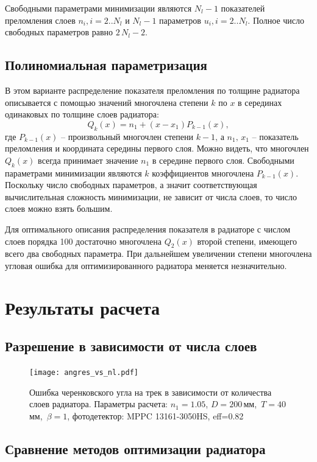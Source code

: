 \documentclass[12pt]{article}
\begin{document}
Свободными параметрами минимизации являются $N_l-1$ показателей преломления слоев $n_i, i=2..N_l$ и $N_l-1$ параметров $u_i, i=2..N_l$. 
Полное число свободных параметров равно $2\,N_l - 2$.

\subsection{Полиномиальная параметризация}
В этом варианте распределение показателя преломления по толщине радиатора описывается с помощью значений многочлена степени $k$ по $x$ в серединах одинаковых по толщине 
слоев радиатора:
\begin{equation}
Q_k(x) = n_1+(x-x_1)P_{k-1}(x),
\label{eq:polpar}
\end{equation}
где $P_{k-1}(x)$ -- произвольный многочлен степени $k-1$, а $n_1,\,x_1$ -- показатель преломления и координата середины первого слоя. 
Можно видеть, что многочлен $Q_k(x)$ всегда принимает значение $n_1$ в середине первого слоя. 
Свободными параметрами минимизации являются $k$ коэффициентов многочлена $P_{k-1}(x)$. Поскольку число свободных параметров, а значит соответствующая 
вычислительная сложность минимизации, не зависит от числа слоев, то число слоев можно взять большим.

Для оптимального описания распределения показателя в радиаторе с числом слоев порядка 100 
достаточно многочлена $Q_2(x)$ второй степени, имеющего всего два свободных параметра. При дальнейшем увеличении степени многочлена 
угловая ошибка для оптимизированного радиатора меняется незначительно.

\section*{Результаты расчета}

\subsection*{Разрешение в зависимости от числа слоев}
\begin{figure}[htb]
\begin{center}
\texttt{[image: angres\_vs\_nl.pdf]}
\caption{Ошибка черенковского угла на трек в зависимости от количества слоев радиатора. Параметры расчета: $n_1=1.05$, $D=200$\,мм,\ $T=40$\,мм,\ $\beta=1$, фотодетектор: MPPC 13161-3050HS, eff=0.82}
\end{center}
\end{figure}


\subsection*{Сравнение методов оптимизации радиатора}
\end{document}
